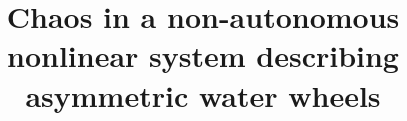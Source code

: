 %
%
%
%
%
%
\RequirePackage{fix-cm}
%
\documentclass[twocolumn]{svjour3}          %
%
\smartqed  %
%
\newcommand{\defequal}{\overset{\textup{def}}=}

\newcommand{\pa}{\partial}
\newcommand{\lp}{\left(}
\newcommand{\rp}{\right)}
\newcommand{\lb}{\left[}
\newcommand{\rb}{\right]}
\newcommand{\be}{\begin{equation}}
\newcommand{\ee}{\end{equation}}
\newcommand{\na}{\nabla}
\newcommand{\z}{\zeta}
\newcommand{\ra}{\rightarrow}
\newcommand{\lal}{\left<}
\newcommand{\ral}{\right>}
\newcommand{\pr}{\prime}
\newcommand{\de}{\delta}

\usepackage{amsmath, amsfonts, amssymb, newlfont, graphicx}



%
%
%
%


\title{Chaos in a non-autonomous nonlinear system describing asymmetric water wheels}

